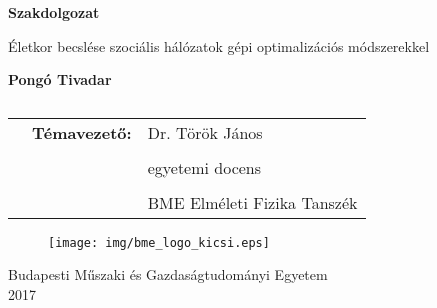 \documentclass[12pt]{article}
\title{}
\date{}
\begin{document}

\begin{titlepage}
	\centering
	{\Huge\bfseries Szakdolgozat\par}
	\vspace{1cm}
	\vspace{1cm}
	{\LARGE Életkor becslése szociális hálózatok gépi optimalizációs módszerekkel\par} %
	\vspace{3cm}
	{\huge\bfseries Pongó Tivadar\\\par}
	\vspace{3cm}
	\begin{table}[H]
		\centering
		\begin{tabular}{ccl}
			&	\LARGE\textbf{Témavezető:} &\Large Dr. Török János \\ %
			& &\\
			& &\Large egyetemi docens \\
			& &\\
			& &\Large BME Elméleti Fizika Tanszék \\
			
		\end{tabular}
		\caption*{}
		\label{t1}
	\end{table}
	\vfill
	\begin{figure}[H]
		\centering
		\texttt{[image: img/bme\_logo\_kicsi.eps]}
	\end{figure} 
	{\large Budapesti Műszaki és Gazdaságtudományi Egyetem\\ 2017 \par}
\end{titlepage}
\onehalfspacing
\iffalse
\end{document}
